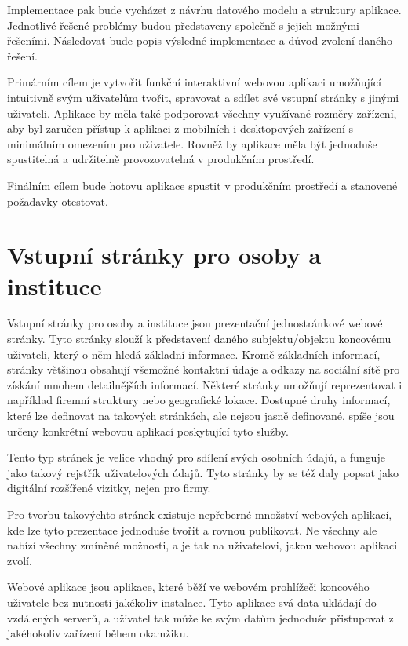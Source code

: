 Implementace pak bude vycházet z návrhu datového modelu a struktury aplikace.
Jednotlivé řešené problémy budou představeny společně s jejich možnými řešeními.
Následovat bude popis výsledné implementace a důvod zvolení daného řešení.

Primárním cílem je vytvořit funkční interaktivní webovou aplikaci umožňující intuitivně svým uživatelům
tvořit, spravovat a sdílet své vstupní stránky s jinými uživateli.
Aplikace by měla také podporovat všechny využívané rozměry zařízení, aby byl zaručen přístup k aplikaci z mobilních
i desktopových zařízení s minimálním omezením pro uživatele.
Rovněž by aplikace měla být jednoduše spustitelná a udržitelně provozovatelná v produkčním prostředí.

Finálním cílem bude hotovu aplikace spustit v produkčním prostředí a stanovené požadavky otestovat.

\section{Vstupní stránky pro osoby a instituce}

Vstupní stránky pro osoby a instituce jsou prezentační jednostránkové webové stránky.
Tyto stránky slouží k představení daného subjektu/objektu koncovému uživateli, který o něm hledá základní
informace.
Kromě základních informací, stránky většinou obsahují všemožné kontaktní údaje a odkazy na sociální sítě pro
získání mnohem detailnějších informací.
Některé stránky umožňují reprezentovat i například firemní struktury nebo geografické lokace.
Dostupné druhy informací, které lze definovat na takových stránkách, ale nejsou jasně definované, spíše jsou
určeny konkrétní webovou aplikací poskytující tyto služby.

Tento typ stránek je velice vhodný pro sdílení svých osobních údajů, a funguje jako takový rejstřík uživatelových
údajů.
Tyto stránky by se též daly popsat jako digitální rozšířené vizitky, nejen pro firmy.

Pro tvorbu takovýchto stránek existuje nepřeberné množství webových aplikací, kde lze
tyto prezentace jednoduše tvořit a rovnou publikovat.
Ne všechny ale nabízí všechny zmíněné možnosti, a je tak na uživatelovi, jakou webovou aplikaci zvolí.

Webové aplikace jsou aplikace, které běží ve webovém prohlížeči koncového uživatele bez nutnosti jakékoliv instalace.
Tyto aplikace svá data ukládají do vzdálených serverů, a
uživatel tak může ke svým datům jednoduše přistupovat z jakéhokoliv zařízení během okamžiku.

